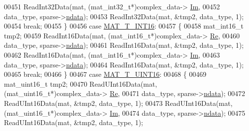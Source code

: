 \begin{DoxyCode}
{00451                                 ReadInt32Data(mat, (mat\_int32\_t*)complex\_data->
      \hyperlink{group___m_a_t_a7182d10b0d3598415887376065440946}{Im},
00452                                     data\_type, sparse->\hyperlink{group___m_a_t_a1beb8a8c58a808207cbea650563a9b63}{ndata});
00453                                 ReadInt32Data(mat, &tmp2, data\_type, 1);
00454                                 \textcolor{keywordflow}{break};
00455                             \}
00456                             \textcolor{keywordflow}{case} \hyperlink{group___m_a_t_ggacf7b3b879282b7ab3a51190e49bf3453a8c5b2e381946e95ea8d81ac216743302}{MAT\_T\_INT16}:
00457                             \{
00458                                 mat\_int16\_t tmp2;
00459                                 ReadInt16Data(mat, (mat\_int16\_t*)complex\_data->
      \hyperlink{group___m_a_t_a484a93607508adac2bce53a0252e0325}{Re},
00460                                     data\_type, sparse->\hyperlink{group___m_a_t_a1beb8a8c58a808207cbea650563a9b63}{ndata});
00461                                 ReadInt16Data(mat, &tmp2, data\_type, 1);
00462                                 ReadInt16Data(mat, (mat\_int16\_t*)complex\_data->
      \hyperlink{group___m_a_t_a7182d10b0d3598415887376065440946}{Im},
00463                                     data\_type, sparse->\hyperlink{group___m_a_t_a1beb8a8c58a808207cbea650563a9b63}{ndata});
00464                                 ReadInt16Data(mat, &tmp2, data\_type, 1);
00465                                 \textcolor{keywordflow}{break};
00466                             \}
00467                             \textcolor{keywordflow}{case} \hyperlink{group___m_a_t_ggacf7b3b879282b7ab3a51190e49bf3453a05bc7af7680aa68be95126ae0a4c2e31}{MAT\_T\_UINT16}:
00468                             \{
00469                                 mat\_uint16\_t tmp2;
00470                                 ReadUInt16Data(mat, (mat\_uint16\_t*)complex\_data->
      \hyperlink{group___m_a_t_a484a93607508adac2bce53a0252e0325}{Re},
00471                                     data\_type, sparse->\hyperlink{group___m_a_t_a1beb8a8c58a808207cbea650563a9b63}{ndata});
00472                                 ReadUInt16Data(mat, &tmp2, data\_type, 1);
00473                                 ReadUInt16Data(mat, (mat\_uint16\_t*)complex\_data->
      \hyperlink{group___m_a_t_a7182d10b0d3598415887376065440946}{Im},
00474                                     data\_type, sparse->\hyperlink{group___m_a_t_a1beb8a8c58a808207cbea650563a9b63}{ndata});
00475                                 ReadUInt16Data(mat, &tmp2, data\_type, 1);
}
\end{DoxyCode}
